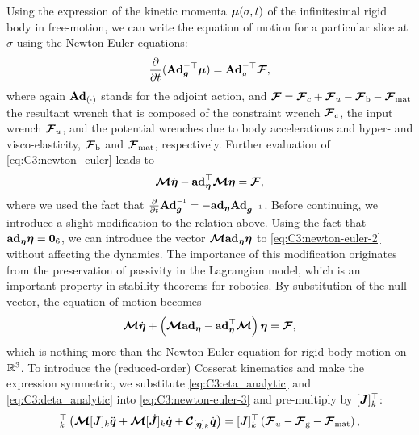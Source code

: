 %
\noindent Using the expression of the kinetic momenta $\boldsymbol{\mu}(\sigma,t)$ of the infinitesimal rigid body in free-motion, we can write the equation of motion for a particular slice at $\sigma$ using the Newton-Euler equations:
%
\begin{equation}
\frac{\partial }{\partial t} (\textbf{Ad}_{{\boldsymbol{g}}}^{-\top} \boldsymbol{\mu}) = \textbf{Ad}_{g}^{-\top}\boldsymbol{\mathcal{F}},\label{eq:C3:newton_euler}
\end{equation}
%
where again $\textbf{Ad}_{(\cdot)}$ stands for the adjoint action, and $\boldsymbol{\mathcal{F}} = \boldsymbol{\mathcal{F}}_c  + \boldsymbol{\mathcal{F}}_u - \boldsymbol{\mathcal{F}}_\textrm{b} - \boldsymbol{\mathcal{F}}_{\textrm{mat}}$ the resultant wrench that is composed of the constraint wrench $\boldsymbol{\mathcal{F}}_c$, the input wrench $\boldsymbol{\mathcal{F}}_u$, and the potential wrenches due to body accelerations and hyper- and visco-elasticity, $\boldsymbol{\mathcal{F}}_\textrm{b}$ and $ \boldsymbol{\mathcal{F}}_{\textrm{mat}}$, respectively. Further evaluation of \eqref{eq:C3:newton_euler} leads to
%
\begin{equation}
{\boldsymbol{\mathcal{M}}}\dot{\boldsymbol{\eta}} - \textbf{ad}_{\boldsymbol{\eta}}^\top {\boldsymbol{\mathcal{M}}} \boldsymbol{\eta} = \boldsymbol{\mathcal{F}},
\label{eq:C3:newton-euler-2}
\end{equation}
%
where we used the fact that $\tfrac{\p}{\p t}{\Ad}_{\vec{g}} \inv = -\ad_{\vec{\eta}} {\Ad}_{\vec{g} \inv}$. Before continuing, we introduce a slight modification to the relation above. Using the fact that $\textbf{ad}_{\boldsymbol{\eta}} \boldsymbol{\eta} = \boldsymbol{0}_6$, we can introduce the vector
$\boldsymbol{\mathcal{M}} \textbf{ad}_{\boldsymbol{\eta}} \boldsymbol{\eta}$ to \eqref{eq:C3:newton-euler-2} without affecting the dynamics. The importance of this modification originates from the preservation of passivity in the Lagrangian model, which is an important property in stability theorems for robotics. By substitution of the null vector, the equation of motion becomes
%
\begin{equation}
  {\boldsymbol{\mathcal{M}}} \dot{\boldsymbol{\eta}} + \left({\boldsymbol{\mathcal{M}}} \textbf{ad}_{\boldsymbol{\eta}}  - \textbf{ad}_{\boldsymbol{\eta}} ^\top {\boldsymbol{\mathcal{M}}} \right) \boldsymbol{\eta} = {\boldsymbol{\mathcal{F}}},
  \label{eq:C3:newton-euler-3}
\end{equation}
%
which is nothing more than the Newton-Euler equation for rigid-body motion on $\mathbb{R}^3$. To introduce the (reduced-order) Cosserat kinematics and make the expression symmetric, we substitute \eqref{eq:C3:eta_analytic} and \eqref{eq:C3:deta_analytic} into \eqref{eq:C3:newton-euler-3} and pre-multiply by $[{\boldsymbol{J}}]_k^\top$:
%
\begin{align}
  [\vec{J}]_k^\top \left( \MT [\mat{J}]_k \ddot{\vec{q}} + \MT [\dJB]_k\dot{\vec{q}} + \CT_{[\vec{\eta}]_k }\dot{\vec{q}}\right) = [\mat{J}]_k^\top \left(\FT_u - \FT\grav -  \ten{F}_{\textrm{mat}} \right),
  \label{eq:C3:projected_NE_jacobian}
\end{align}

